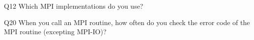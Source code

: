 \begin{description}%
\item{Q12} Which MPI implementations do you use?%
\item{Q20} When you call an MPI routine, how often do you check the error code of the MPI routine  (excepting MPI-IO)?%
\end{description}%
